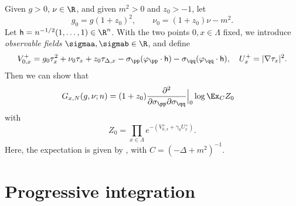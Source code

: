 Given $g>0$, $\nu\in \R$, and  given $m^2>0$ and $z_0 >-1$, let
\begin{equation}
  \label{e:gg0}
  g_0 = g(1+z_0)^2, \quad \quad
  \nu_0 = (1+z_0)\nu-m^2.
\end{equation}
Let ${\sf h} = n^{-1/2}(1, \ldots, 1) \in \R^n$.
With the two points $0,x\in \Lambda$ fixed,
we introduce \emph{observable fields} $\sigmaa, \sigmab \in \R$, and define
\begin{equation}
\label{e:V0def}
  V^+_{0,x}
  = g_0\tau_x^2 + \nu_0 \tau_x + z_0 \tau_{\Delta,x} -
    \sigma_\pp (\varphi_{\pp} \cdot {\sf h})
    - \sigma_\qq (\varphi_{\qq} \cdot {\sf h}),
  \quad
  U^+_x = |\nabla \tau_x|^2.
\end{equation}
Then we can show that
\begin{align}
\label{e:generating-fn}
    G_{x,N}(g, \nu; n)
    &=
    (1+z_0)
    \frac{\partial^2 }{\partial \sigma_\pp  \partial \sigma_\qq }
    \Big|_{0}
    \log
    \Ex_C  Z_0
\end{align}
with
\begin{equation}
\label{e:Z0def}
  Z_0
  =
  \prod_{x\in \Lambda} e^{-(V^+_{0,x} + \gamma_0 U^+_x)}.
\end{equation}
Here, the expectation is given by , with $C = (-\Delta + m^2)^{-1}$.


\section{Progressive integration}
\label{sec:prog}

